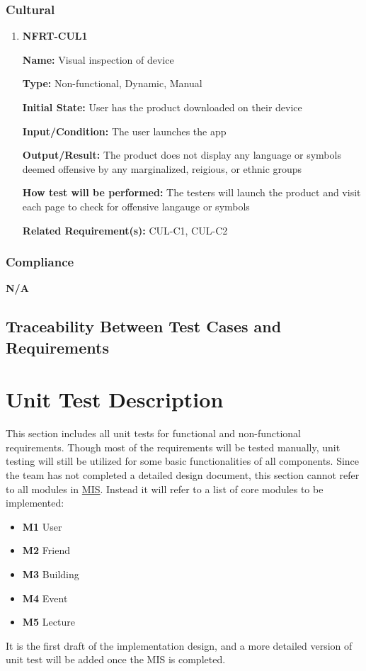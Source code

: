 \documentclass[12pt, titlepage]{article}
\begin{document}
\subsubsection{Cultural}

\begin{enumerate}
\item{\textbf{NFRT-CUL1}}

\textbf{Name:} Visual inspection of device

\textbf{Type:} Non-functional, Dynamic, Manual

\textbf{Initial State:} User has the product downloaded on their device

\textbf{Input/Condition:} The user launches the app

\textbf{Output/Result:} The product does not display any language or symbols deemed offensive by any marginalized, reigious, or ethnic groups

\textbf{How test will be performed:} The testers will launch the product and visit each page to check for offensive langauge or symbols

\textbf{Related Requirement(s):} CUL-C1, CUL-C2

\end{enumerate}

\subsubsection{Compliance}

\quad \textbf{N/A}

\subsection{Traceability Between Test Cases and Requirements}


\section{Unit Test Description}

This section includes all unit tests for functional and non-functional requirements. Though most of the requirements will be tested manually, unit testing will still be utilized for some basic functionalities of all components. Since the team has not completed a detailed design document, this section cannot refer to all modules in \href{https://github.com/beatlepie/4G06CapstoneProjectTeam2/blob/main/docs/Design/SoftDetailedDes/MIS.pdf}{MIS}. Instead it will refer to a list of core modules to be implemented:
\begin{itemize}
	\item \textbf{M1} User
	\item \textbf{M2} Friend
	\item \textbf{M3} Building
	\item \textbf{M4} Event
	\item \textbf{M5} Lecture
\end{itemize}
It is the first draft of the implementation design, and a more detailed version of unit test will be added once the MIS is completed.
\end{document}
